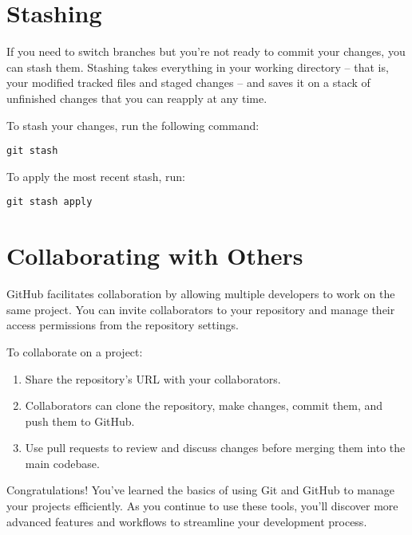 \documentclass[10pt,twocolumn]{article}
\begin{document}
\section{Stashing}

If you need to switch branches but you're not ready to commit your changes, you can stash them. Stashing takes everything in your working directory -- that is, your modified tracked files and staged changes -- and saves it on a stack of unfinished changes that you can reapply at any time.

To stash your changes, run the following command:

\begin{verbatim}
git stash
\end{verbatim}

To apply the most recent stash, run:

\begin{verbatim}
git stash apply
\end{verbatim}


\section{Collaborating with Others}

GitHub facilitates collaboration by allowing multiple developers to work on the same project. You can invite collaborators to your repository and manage their access permissions from the repository settings.

To collaborate on a project:

\begin{enumerate}
    \item Share the repository's URL with your collaborators.
    \item Collaborators can clone the repository, make changes, commit them, and push them to GitHub.
    \item Use pull requests to review and discuss changes before merging them into the main codebase.
\end{enumerate}

Congratulations! You've learned the basics of using Git and GitHub to manage your projects efficiently. As you continue to use these tools, you'll discover more advanced features and workflows to streamline your development process.
\end{document}
